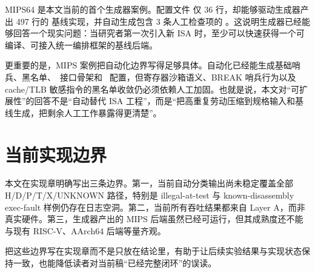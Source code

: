MIPS64 是本文当前的首个生成器案例。配置文件  仅 36 行，却能够驱动生成器产出 497 行的  基线实现，并自动生成包含 3 条人工检查项的 。这说明生成器已经能够回答一个现实问题：当研究者第一次引入新 ISA 时，至少可以快速获得一个可编译、可接入统一编排框架的基线后端。

更重要的是，MIPS 案例把自动化边界写得足够具体。自动化已经能生成基础哨兵、黑名单、\ptracebackend\ 接口骨架和 \capstone\ 配置，但寄存器沙箱语义、BREAK 哨兵行为以及 cache/TLB 敏感指令的黑名单收敛仍必须依赖人工加固。也就是说，本文对“可扩展性”的回答不是“自动替代 ISA 工程”，而是“把高重复劳动压缩到规格输入和基线生成，把剩余人工工作暴露得更清楚”。

\section{当前实现边界}

本文在实现章明确写出三条边界。第一，当前自动分类输出尚未稳定覆盖全部 H/D/P/T/X/UNKNOWN 路径，特别是 illegal-at-test 与 known-disassembly exec-fault 样例仍存在日志空洞。第二，当前所有吞吐结果都来自 Layer A，而非真实硬件。第三，生成器产出的 MIPS 后端虽然已经可运行，但其成熟度还不能与现有 RISC-V、AArch64 后端等量齐观。

把这些边界写在实现章而不是只放在结论里，有助于让后续实验结果与实现状态保持一致，也能降低读者对当前稿“已经完整闭环”的误读。
